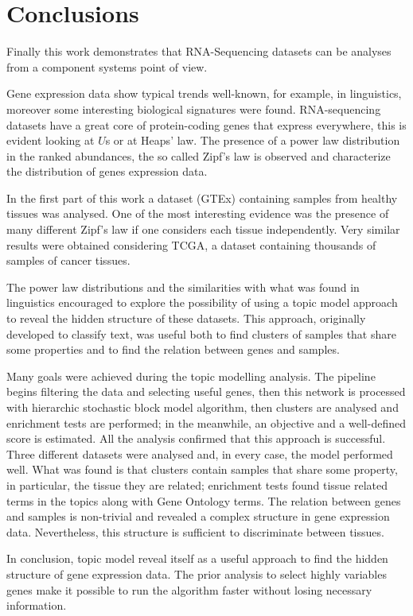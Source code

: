 \chapter{Conclusions}\label{ch:conclusions}
Finally this work demonstrates that RNA-Sequencing datasets can be analyses from a component systems point of view.

Gene expression data show typical trends well-known, for example, in linguistics, moreover some interesting biological signatures were found. RNA-sequencing datasets have a great core of protein-coding genes that express everywhere, this is evident looking at $U$s or at Heaps' law. The presence of a power law distribution in the ranked abundances, the so called Zipf's law is observed and characterize the distribution of genes expression data.

In the first part of this work a dataset (GTEx) containing samples from healthy tissues was analysed. One of the most interesting evidence was the presence of many different Zipf's law if one considers each tissue independently. Very similar results were obtained considering TCGA, a dataset containing thousands of samples of cancer tissues.

The power law distributions and the similarities with what was found in linguistics encouraged to explore the possibility of using a topic model approach to reveal the hidden structure of these datasets. This approach, originally developed to classify text, was useful both to find clusters of samples that share some properties and to find the relation between genes and samples.

Many goals were achieved during the topic modelling analysis. The pipeline begins filtering the data and selecting useful genes, then this network is processed with hierarchic stochastic block model algorithm, then clusters are analysed and enrichment tests are performed; in the meanwhile, an objective and a well-defined score is estimated. All the analysis confirmed that this approach is successful. Three different datasets were analysed and, in every case, the model performed well. What was found is that clusters contain samples that share some property, in particular, the tissue they are related; enrichment tests found tissue related terms in the topics along with Gene Ontology terms. The relation between genes and samples is non-trivial and revealed a complex structure in gene expression data. Nevertheless, this structure is sufficient to discriminate between tissues.

In conclusion, topic model reveal itself as a useful approach to find the hidden structure of gene expression data. The prior analysis to select highly variables genes make it possible to run the algorithm faster without losing necessary information.

